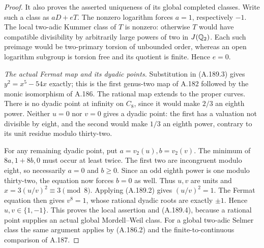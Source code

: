 \begin{proof}
It also proves the asserted uniqueness of its
global completed classes.  Write such a class as
\(aD+eT\).  The nonzero logarithm forces
\(a=1\), respectively \(-1\).  The local
two-adic Kummer class of \(T\) is nonzero: otherwise
\(T\) would have compatible divisibility by
arbitrarily large powers of two in \(J(\mathbb Q_2)\).
Each such preimage would be two-primary torsion
of unbounded order, whereas an open logarithm
subgroup is torsion free and its quotient is finite.
Hence \(e=0\).

\emph{The actual Fermat map and its dyadic points.}
Substitution in (A.189.3) gives
\(y^2=x^5-54x\) exactly; this is the first
genus-two map of A.182 followed by the monic
isomorphism of A.186.  The rational map extends
to the proper curves.
There is no dyadic point at infinity on \(C_8\),
since it would make \(2/3\) an eighth power.
Neither \(u=0\) nor \(v=0\) gives a dyadic
point: the first has a valuation not divisible
by eight, and the second would make \(1/3\)
an eighth power, contrary to its unit residue
modulo thirty-two.

For any remaining dyadic point, put
\(a=v_2(u),b=v_2(v)\).  The minimum of
\(8a,1+8b,0\) must occur at least twice.
The first two are incongruent modulo eight,
so necessarily \(a=0\) and \(b\geq0\).
Since an odd eighth power is one modulo
thirty-two, the equation now forces \(b=0\)
as well.  Thus \(u,v\) are units and
\(x=3(u/v)^2\equiv3\pmod8\).
Applying (A.189.2) gives \((u/v)^2=1\).
The Fermat equation then gives \(v^8=1\),
whose rational dyadic roots are exactly \(\pm1\).
Hence \(u,v\in\{1,-1\}\).
This proves the local assertion and (A.189.4),
because a rational point supplies an actual
global Mordell--Weil class.  For a global
two-adic Selmer class the same argument applies
by (A.186.2) and the finite-to-continuous
comparison of A.187.


\end{proof}
